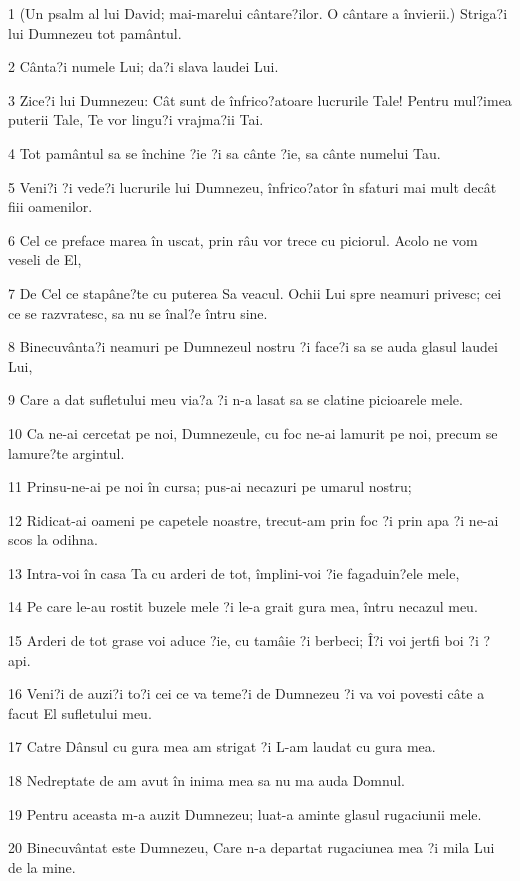 \par 1 (Un psalm al lui David; mai-marelui cântare?ilor. O cântare a învierii.) Striga?i lui Dumnezeu tot pamântul.
\par 2 Cânta?i numele Lui; da?i slava laudei Lui.
\par 3 Zice?i lui Dumnezeu: Cât sunt de înfrico?atoare lucrurile Tale! Pentru mul?imea puterii Tale, Te vor lingu?i vrajma?ii Tai.
\par 4 Tot pamântul sa se închine ?ie ?i sa cânte ?ie, sa cânte numelui Tau.
\par 5 Veni?i ?i vede?i lucrurile lui Dumnezeu, înfrico?ator în sfaturi mai mult decât fiii oamenilor.
\par 6 Cel ce preface marea în uscat, prin râu vor trece cu piciorul. Acolo ne vom veseli de El,
\par 7 De Cel ce stapâne?te cu puterea Sa veacul. Ochii Lui spre neamuri privesc; cei ce se razvratesc, sa nu se înal?e întru sine.
\par 8 Binecuvânta?i neamuri pe Dumnezeul nostru ?i face?i sa se auda glasul laudei Lui,
\par 9 Care a dat sufletului meu via?a ?i n-a lasat sa se clatine picioarele mele.
\par 10 Ca ne-ai cercetat pe noi, Dumnezeule, cu foc ne-ai lamurit pe noi, precum se lamure?te argintul.
\par 11 Prinsu-ne-ai pe noi în cursa; pus-ai necazuri pe umarul nostru;
\par 12 Ridicat-ai oameni pe capetele noastre, trecut-am prin foc ?i prin apa ?i ne-ai scos la odihna.
\par 13 Intra-voi în casa Ta cu arderi de tot, împlini-voi ?ie fagaduin?ele mele,
\par 14 Pe care le-au rostit buzele mele ?i le-a grait gura mea, întru necazul meu.
\par 15 Arderi de tot grase voi aduce ?ie, cu tamâie ?i berbeci; Î?i voi jertfi boi ?i ?api.
\par 16 Veni?i de auzi?i to?i cei ce va teme?i de Dumnezeu ?i va voi povesti câte a facut El sufletului meu.
\par 17 Catre Dânsul cu gura mea am strigat ?i L-am laudat cu gura mea.
\par 18 Nedreptate de am avut în inima mea sa nu ma auda Domnul.
\par 19 Pentru aceasta m-a auzit Dumnezeu; luat-a aminte glasul rugaciunii mele.
\par 20 Binecuvântat este Dumnezeu, Care n-a departat rugaciunea mea ?i mila Lui de la mine.

